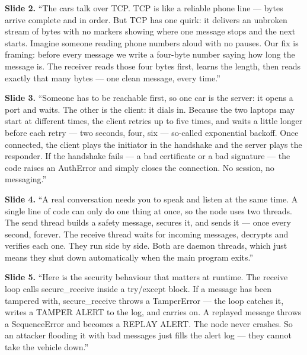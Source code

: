 \documentclass[11pt,a4paper]{article}
\begin{document}
\textbf{Slide 2.} ``The cars talk over TCP. TCP is like a reliable phone line ---
bytes arrive complete and in order. But TCP has one quirk: it delivers an
unbroken stream of bytes with no markers showing where one message stops and the
next starts. Imagine someone reading phone numbers aloud with no pauses. Our fix
is framing: before every message we write a four-byte number saying how long the
message is. The receiver reads those four bytes first, learns the length, then
reads exactly that many bytes --- one clean message, every time.''

\textbf{Slide 3.} ``Someone has to be reachable first, so one car is the server:
it opens a port and waits. The other is the client: it dials in. Because the two
laptops may start at different times, the client retries up to five times, and
waits a little longer before each retry --- two seconds, four, six --- so-called
exponential backoff. Once connected, the client plays the initiator in the
handshake and the server plays the responder. If the handshake fails --- a bad
certificate or a bad signature --- the code raises an AuthError and simply closes
the connection. No session, no messaging.''

\textbf{Slide 4.} ``A real conversation needs you to speak and listen at the same
time. A single line of code can only do one thing at once, so the node uses two
threads. The send thread builds a safety message, secures it, and sends it ---
once every second, forever. The receive thread waits for incoming messages,
decrypts and verifies each one. They run side by side. Both are daemon threads,
which just means they shut down automatically when the main program exits.''

\textbf{Slide 5.} ``Here is the security behaviour that matters at runtime. The
receive loop calls secure\_receive inside a try/except block. If a message has
been tampered with, secure\_receive throws a TamperError --- the loop catches it,
writes a TAMPER ALERT to the log, and carries on. A replayed message throws a
SequenceError and becomes a REPLAY ALERT. The node never crashes. So an attacker
flooding it with bad messages just fills the alert log --- they cannot take the
vehicle down.''
\end{document}
